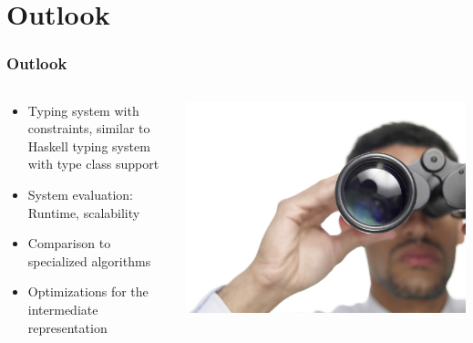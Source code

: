 \section{Outlook}

\begin{frame}
	\frametitle{Outlook}
	\begin{columns}
		\begin{column}{0.6\textwidth}
			\begin{itemize}
				\item Typing system with constraints, similar to Haskell typing system with type class support
				\item System evaluation: Runtime, scalability
				\item Comparison to specialized algorithms
				\item Optimizations for the intermediate representation
			\end{itemize}
		\end{column}
		\begin{column}{0.4\textwidth}
			\includegraphics[width=\textwidth]{images/outlook.jpg}
		\end{column}
	\end{columns}
\end{frame}